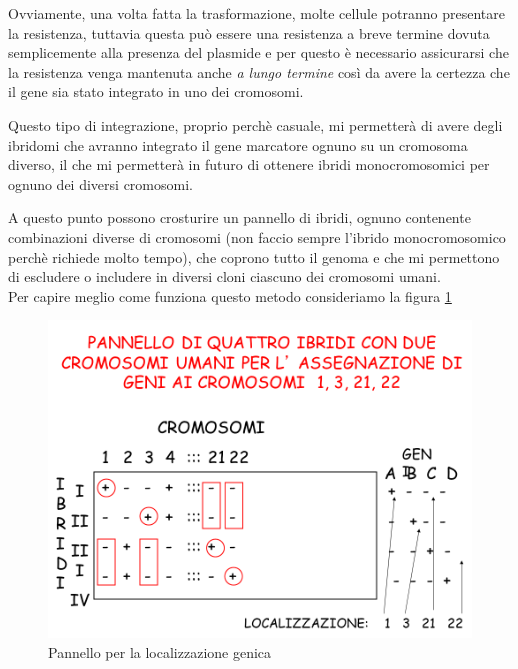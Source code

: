 \documentclass[11pt]{book}
\begin{document}
Ovviamente, una volta fatta la trasformazione, molte cellule potranno presentare la resistenza, tuttavia questa può essere una resistenza a breve termine dovuta semplicemente alla presenza del plasmide e per questo è necessario assicurarsi che la resistenza venga mantenuta anche \emph{a lungo termine} così da avere la certezza che il gene sia stato integrato in uno dei cromosomi.

Questo tipo di integrazione, proprio perchè casuale, mi permetterà di avere degli ibridomi che avranno integrato il gene marcatore ognuno su un cromosoma diverso, il che mi permetterà in futuro di ottenere ibridi monocromosomici per ognuno dei diversi cromosomi.

A questo punto possono crosturire un pannello di ibridi, ognuno contenente combinazioni diverse di cromosomi (non faccio sempre l'ibrido monocromosomico perchè richiede molto tempo), che coprono tutto il genoma e che mi permettono di escludere o includere in diversi cloni ciascuno dei cromosomi umani.\\
Per capire meglio come funziona questo metodo consideriamo la figura \ref{localizzazione_genica}

\begin{figure}[htp]
\centering
\includegraphics[scale=0.70]{img/33_localizzazione_genica.png}
\caption{Pannello per la localizzazione genica}
\label{localizzazione_genica}
\end{figure}
\end{document}

